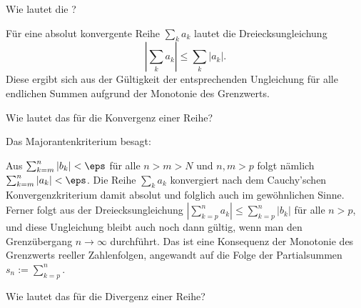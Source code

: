\begin{frage}
  Wie lautet die 
  ?
\end{frage}

\begin{antwort}
  Für eine absolut konvergente Reihe $\sum_k a_k$ lautet die 
  Dreiecksungleichung 
  \[
  \left| \sum_k a_k \right| \le \sum_k |a_k|.
  \]
  Diese ergibt sich aus der 
  Gültigkeit der entsprechenden Ungleichung für alle endlichen Summen 
  aufgrund der Monotonie des Grenzwerts.
  \AntEnd
\end{antwort}

\begin{frage}\label{02_maj}
  Wie lautet das  
  für die Konvergenz einer Reihe?
\end{frage}

\begin{antwort}
  Das Majorantenkriterium besagt: 

  \medskip
  \noindent

  \medskip\noindent
  Aus $\sum_{k=m}^n |b_k| < \eps$ für alle $n>m>N$ 
  und $n,m>p$ folgt nämlich $\sum_{k=m}^n |a_k| < \eps$. Die Reihe 
  $\sum_k a_k$ konvergiert nach dem Cauchy'schen Konvergenzkriterium damit 
  absolut und folglich auch im gewöhnlichen Sinne. Ferner folgt 
  aus der Dreiecksungleichung 
  $\left| \sum_{k=p}^n a_k \right|  \le \sum_{k=p}^n |b_k|$ für alle 
  $n>p$, und diese Ungleichung bleibt auch noch dann gültig, wenn man 
  den Grenzübergang $n\to \infty$ durchführt. Das ist eine Konsequenz
  der Monotonie des Grenzwerts reeller Zahlenfolgen, angewandt auf die 
  Folge der Partialsummen $s_n:=\sum_{k=p}^n$.  
  \AntEnd 
\end{antwort}

\begin{frage}
  Wie lautet das  für die Divergenz einer 
  Reihe?
\end{frage}


